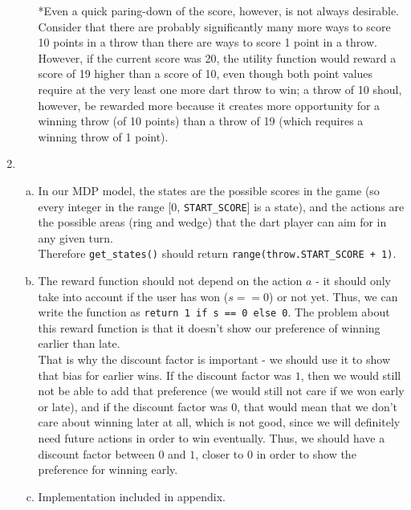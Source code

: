 \documentclass{article}
\begin{document}
\begin{enumerate}
\begin{enumerate}[(a)]
                *Even a quick paring-down of the score, however, is not always desirable. Consider that there are probably significantly many more ways to score 10 points in a throw than there are ways to score 1 point in a throw. However, if the current score was 20, the utility function would reward a score of 19 higher than a score of 10, even though both point values require at the very least one more dart throw to win; a throw of 10 shoul, however, be rewarded more because it creates more opportunity for a winning throw (of 10 points) than a throw of 19 (which requires a winning throw of 1 point).
            \end{enumerate}
        \item
            \begin{enumerate}[(a)]
                \item In our MDP model, the states are the possible scores in the game (so every integer in the range [0, \texttt{START\_SCORE}] is a state), and the actions are the possible areas (ring and wedge) that the dart player can aim for in any given turn. \\

                Therefore \texttt{get\_states()} should return \texttt{range(throw.START\_SCORE + 1)}.
                \item The reward function should not depend on the action $a$ - it should only take into account if the user has won ($s==0$) or not yet.  Thus, we can write the function as \texttt{return 1 if s == 0 else 0}. The problem about this reward function is that it doesn't show our preference of winning earlier than late.\\
                
               That is why the discount factor is important - we should use it to show that bias for earlier wins. If the discount factor was $1$, then we would still not be able to add that preference (we would still not care if we won early or late), and if the discount factor was $0$, that would mean that we don't care about winning later at all, which is not good, since we will definitely need future actions in order to win eventually. Thus, we should have a discount factor between $0$ and $1$, closer to $0$ in order to show the preference for winning early.
                 \item Implementation included in appendix.
                

\end{enumerate}
\end{enumerate}
\end{document}
